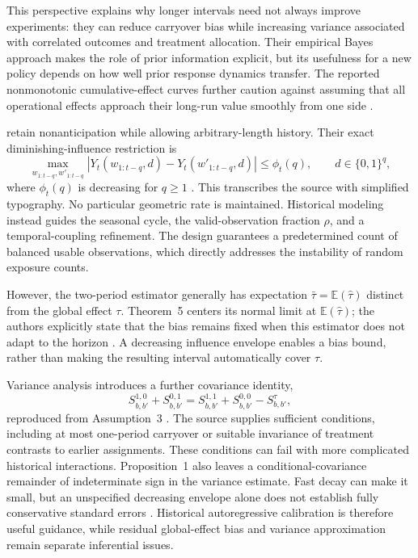 This perspective explains why longer intervals need not always improve experiments: they can reduce carryover bias while increasing variance associated with correlated outcomes and treatment allocation. Their empirical Bayes approach makes the role of prior information explicit, but its usefulness for a new policy depends on how well prior response dynamics transfer. The reported nonmonotonic cumulative-effect curves further caution against assuming that all operational effects approach their long-run value smoothly from one side \citep[Sections~1 and~6]{xiong2024}.

\citet{ni2025model} retain nonanticipation while allowing arbitrary-length history. Their exact diminishing-influence restriction is
\begin{equation}\label{eq:ni-history-envelope}
\max_{w_{1:t-q},w'_{1:t-q}}
\left|Y_t(w_{1:t-q},d)-Y_t(w'_{1:t-q},d)\right|
\leq\phi_t(q),\qquad d\in\{0,1\}^{q},
\end{equation}
where $\phi_t(q)$ is decreasing for $q\geq1$ \citep[Assumption~2, Eq.~(8), p.~14]{ni2025model}. This transcribes the source with simplified typography. No particular geometric rate is maintained. Historical modeling instead guides the seasonal cycle, the valid-observation fraction $\rho$, and a temporal-coupling refinement. The design guarantees a predetermined count of balanced usable observations, which directly addresses the instability of random exposure counts.

However, the two-period estimator generally has expectation $\bar\tau=\mathbb{E}(\widehat\tau)$ distinct from the global effect $\tau$. Theorem~5 centers its normal limit at $\mathbb{E}(\widehat\tau)$; the authors explicitly state that the bias remains fixed when this estimator does not adapt to the horizon \citep[p.~25]{ni2025model}. A decreasing influence envelope enables a bias bound, rather than making the resulting interval automatically cover $\tau$.

Variance analysis introduces a further covariance identity,
\begin{equation}\label{eq:ni-covariance-identity}
S_{b,b'}^{1,0}+S_{b,b'}^{0,1}
=S_{b,b'}^{1,1}+S_{b,b'}^{0,0}-S_{b,b'}^{\tau},
\end{equation}
reproduced from Assumption~3 \citep[pp.~18--19]{ni2025model}. The source supplies sufficient conditions, including at most one-period carryover or suitable invariance of treatment contrasts to earlier assignments. These conditions can fail with more complicated historical interactions. Proposition~1 also leaves a conditional-covariance remainder of indeterminate sign in the variance estimate. Fast decay can make it small, but an unspecified decreasing envelope alone does not establish fully conservative standard errors \citep[p.~26]{ni2025model}. Historical autoregressive calibration is therefore useful guidance, while residual global-effect bias and variance approximation remain separate inferential issues.

